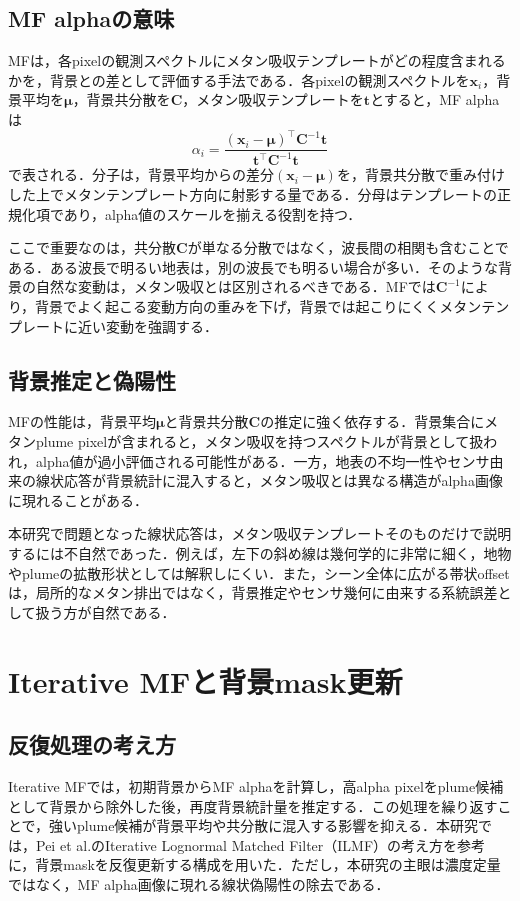 \documentclass[a4paper,10pt]{ltjsarticle}
\begin{document}
\subsection{MF alphaの意味}
MFは，各pixelの観測スペクトルにメタン吸収テンプレートがどの程度含まれるかを，背景との差として評価する手法である．各pixelの観測スペクトルを$\mathbf{x}_i$，背景平均を$\boldsymbol{\mu}$，背景共分散を$\mathbf{C}$，メタン吸収テンプレートを$\mathbf{t}$とすると，MF alphaは
\begin{equation}
  \alpha_i =
  \frac{(\mathbf{x}_i-\boldsymbol{\mu})^\top \mathbf{C}^{-1}\mathbf{t}}
       {\mathbf{t}^\top \mathbf{C}^{-1}\mathbf{t}}
  \label{eq:mf}
\end{equation}
で表される．分子は，背景平均からの差分$(\mathbf{x}_i-\boldsymbol{\mu})$を，背景共分散で重み付けした上でメタンテンプレート方向に射影する量である．分母はテンプレートの正規化項であり，alpha値のスケールを揃える役割を持つ．

ここで重要なのは，共分散$\mathbf{C}$が単なる分散ではなく，波長間の相関も含むことである．ある波長で明るい地表は，別の波長でも明るい場合が多い．そのような背景の自然な変動は，メタン吸収とは区別されるべきである．MFでは$\mathbf{C}^{-1}$により，背景でよく起こる変動方向の重みを下げ，背景では起こりにくくメタンテンプレートに近い変動を強調する．

\subsection{背景推定と偽陽性}
MFの性能は，背景平均$\boldsymbol{\mu}$と背景共分散$\mathbf{C}$の推定に強く依存する．背景集合にメタンplume pixelが含まれると，メタン吸収を持つスペクトルが背景として扱われ，alpha値が過小評価される可能性がある．一方，地表の不均一性やセンサ由来の線状応答が背景統計に混入すると，メタン吸収とは異なる構造がalpha画像に現れることがある．

本研究で問題となった線状応答は，メタン吸収テンプレートそのものだけで説明するには不自然であった．例えば，左下の斜め線は幾何学的に非常に細く，地物やplumeの拡散形状としては解釈しにくい．また，シーン全体に広がる帯状offsetは，局所的なメタン排出ではなく，背景推定やセンサ幾何に由来する系統誤差として扱う方が自然である．

\section{Iterative MFと背景mask更新}
\subsection{反復処理の考え方}
Iterative MFでは，初期背景からMF alphaを計算し，高alpha pixelをplume候補として背景から除外した後，再度背景統計量を推定する．この処理を繰り返すことで，強いplume候補が背景平均や共分散に混入する影響を抑える．本研究では，Pei et al.のIterative Lognormal Matched Filter（ILMF）\cite{pei2023}の考え方を参考に，背景maskを反復更新する構成を用いた．ただし，本研究の主眼は濃度定量ではなく，MF alpha画像に現れる線状偽陽性の除去である．
\end{document}

